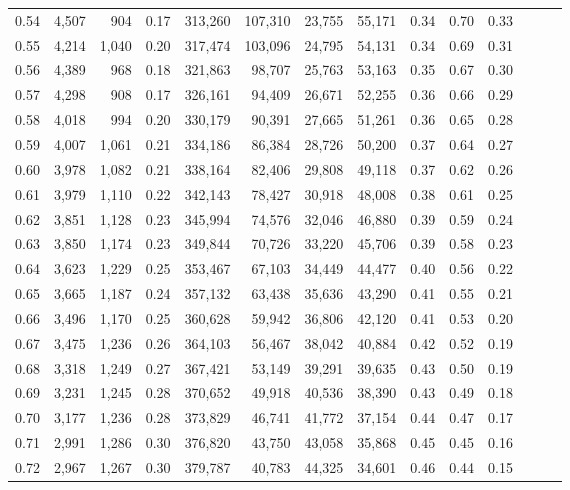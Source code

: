 \begin{tabular}{rrrrrrrrrrrrrr}
0.54 &  4,507 &    904 &  0.17 &  313,260 &  107,310 &  23,755 &  55,171 &  0.34 &  0.70 &      0.33 \\
0.55 &  4,214 &  1,040 &  0.20 &  317,474 &  103,096 &  24,795 &  54,131 &  0.34 &  0.69 &      0.31 \\
0.56 &  4,389 &    968 &  0.18 &  321,863 &   98,707 &  25,763 &  53,163 &  0.35 &  0.67 &      0.30 \\
0.57 &  4,298 &    908 &  0.17 &  326,161 &   94,409 &  26,671 &  52,255 &  0.36 &  0.66 &      0.29 \\
0.58 &  4,018 &    994 &  0.20 &  330,179 &   90,391 &  27,665 &  51,261 &  0.36 &  0.65 &      0.28 \\
0.59 &  4,007 &  1,061 &  0.21 &  334,186 &   86,384 &  28,726 &  50,200 &  0.37 &  0.64 &      0.27 \\
0.60 &  3,978 &  1,082 &  0.21 &  338,164 &   82,406 &  29,808 &  49,118 &  0.37 &  0.62 &      0.26 \\
0.61 &  3,979 &  1,110 &  0.22 &  342,143 &   78,427 &  30,918 &  48,008 &  0.38 &  0.61 &      0.25 \\
0.62 &  3,851 &  1,128 &  0.23 &  345,994 &   74,576 &  32,046 &  46,880 &  0.39 &  0.59 &      0.24 \\
0.63 &  3,850 &  1,174 &  0.23 &  349,844 &   70,726 &  33,220 &  45,706 &  0.39 &  0.58 &      0.23 \\
0.64 &  3,623 &  1,229 &  0.25 &  353,467 &   67,103 &  34,449 &  44,477 &  0.40 &  0.56 &      0.22 \\
0.65 &  3,665 &  1,187 &  0.24 &  357,132 &   63,438 &  35,636 &  43,290 &  0.41 &  0.55 &      0.21 \\
0.66 &  3,496 &  1,170 &  0.25 &  360,628 &   59,942 &  36,806 &  42,120 &  0.41 &  0.53 &      0.20 \\
0.67 &  3,475 &  1,236 &  0.26 &  364,103 &   56,467 &  38,042 &  40,884 &  0.42 &  0.52 &      0.19 \\
0.68 &  3,318 &  1,249 &  0.27 &  367,421 &   53,149 &  39,291 &  39,635 &  0.43 &  0.50 &      0.19 \\
0.69 &  3,231 &  1,245 &  0.28 &  370,652 &   49,918 &  40,536 &  38,390 &  0.43 &  0.49 &      0.18 \\
0.70 &  3,177 &  1,236 &  0.28 &  373,829 &   46,741 &  41,772 &  37,154 &  0.44 &  0.47 &      0.17 \\
0.71 &  2,991 &  1,286 &  0.30 &  376,820 &   43,750 &  43,058 &  35,868 &  0.45 &  0.45 &      0.16 \\
0.72 &  2,967 &  1,267 &  0.30 &  379,787 &   40,783 &  44,325 &  34,601 &  0.46 &  0.44 &      0.15 \\

\end{tabular}
